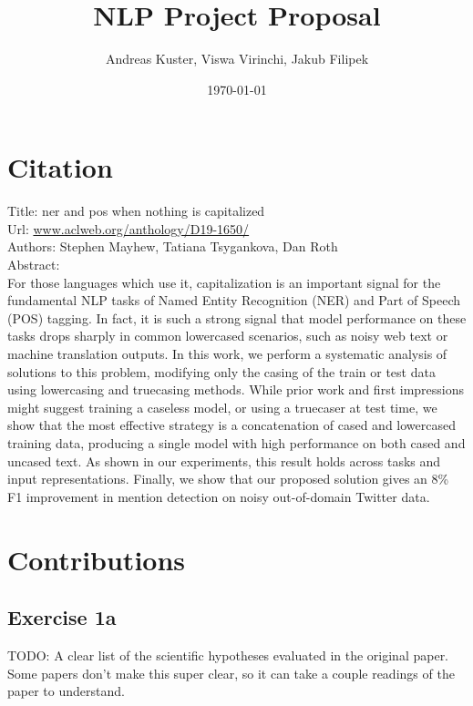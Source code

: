 \documentclass{article}
\title{NLP Project Proposal}
\author{Andreas Kuster, Viswa Virinchi, Jakub Filipek}
\date{\today}
\begin{document}
\maketitle

\section*{Citation}

Title: ner and pos when nothing is capitalized \\

\noindent
Url: \href{https://www.aclweb.org/anthology/D19-1650/}{www.aclweb.org/anthology/D19-1650/} \\

\noindent
Authors: Stephen Mayhew, Tatiana Tsygankova, Dan Roth \\

\noindent
Abstract:  \\
For those languages which use it, capitalization is an important signal for the fundamental NLP tasks of Named Entity Recognition (NER) and Part of Speech (POS) tagging. In fact, it is such a strong signal that model performance on these tasks drops sharply in common lowercased scenarios, such as noisy web text or machine translation outputs. In this work, we perform a systematic analysis of solutions to this problem, modifying only the casing of the train or test data using lowercasing and truecasing methods. While prior work and first impressions might suggest training a caseless model, or using a truecaser at test time, we show that the most effective strategy is a concatenation of cased and lowercased training data, producing a single model with high performance on both cased and uncased text. As shown in our experiments, this result holds across tasks and input representations. Finally, we show that our proposed solution gives an 8\% F1 improvement in mention detection on noisy out-of-domain Twitter data.


\section{Contributions}

\subsection*{Exercise 1a}
TODO: A clear list of the scientific hypotheses evaluated in the original paper. Some papers don't make this super clear, so it can take a couple readings of the paper to understand.
\end{document}
